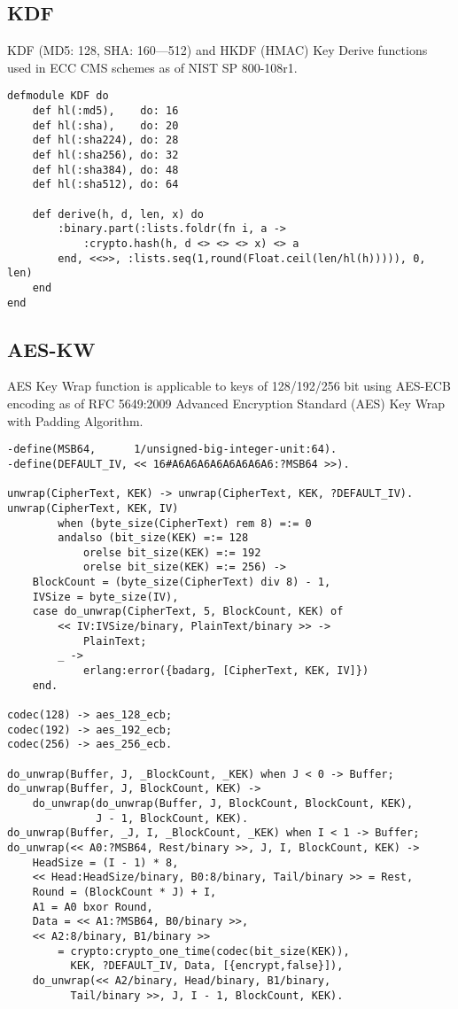 \subsection{KDF}

KDF (MD5: 128, SHA: 160—512) and HKDF (HMAC) Key Derive functions used in ECC CMS schemes as of NIST SP 800-108r1.

\begin{lstlisting}
defmodule KDF do
    def hl(:md5),    do: 16
    def hl(:sha),    do: 20
    def hl(:sha224), do: 28
    def hl(:sha256), do: 32
    def hl(:sha384), do: 48
    def hl(:sha512), do: 64

    def derive(h, d, len, x) do
        :binary.part(:lists.foldr(fn i, a ->
            :crypto.hash(h, d <> <> <> x) <> a
        end, <<>>, :lists.seq(1,round(Float.ceil(len/hl(h))))), 0, len)
    end
end
\end{lstlisting}

\newpage
\subsection{AES-KW}

AES Key Wrap function is applicable to keys of 128/192/256 bit using AES-ECB encoding as of RFC 5649:2009 Advanced Encryption Standard (AES) Key Wrap with Padding Algorithm.

\begin{lstlisting}
-define(MSB64,      1/unsigned-big-integer-unit:64).
-define(DEFAULT_IV, << 16#A6A6A6A6A6A6A6A6:?MSB64 >>).

unwrap(CipherText, KEK) -> unwrap(CipherText, KEK, ?DEFAULT_IV).
unwrap(CipherText, KEK, IV)
        when (byte_size(CipherText) rem 8) =:= 0
        andalso (bit_size(KEK) =:= 128
            orelse bit_size(KEK) =:= 192
            orelse bit_size(KEK) =:= 256) ->
    BlockCount = (byte_size(CipherText) div 8) - 1,
    IVSize = byte_size(IV),
    case do_unwrap(CipherText, 5, BlockCount, KEK) of
        << IV:IVSize/binary, PlainText/binary >> ->
            PlainText;
        _ ->
            erlang:error({badarg, [CipherText, KEK, IV]})
    end.

codec(128) -> aes_128_ecb;
codec(192) -> aes_192_ecb;
codec(256) -> aes_256_ecb.

do_unwrap(Buffer, J, _BlockCount, _KEK) when J < 0 -> Buffer;
do_unwrap(Buffer, J, BlockCount, KEK) ->
    do_unwrap(do_unwrap(Buffer, J, BlockCount, BlockCount, KEK),
              J - 1, BlockCount, KEK).
do_unwrap(Buffer, _J, I, _BlockCount, _KEK) when I < 1 -> Buffer;
do_unwrap(<< A0:?MSB64, Rest/binary >>, J, I, BlockCount, KEK) ->
    HeadSize = (I - 1) * 8,
    << Head:HeadSize/binary, B0:8/binary, Tail/binary >> = Rest,
    Round = (BlockCount * J) + I,
    A1 = A0 bxor Round,
    Data = << A1:?MSB64, B0/binary >>,
    << A2:8/binary, B1/binary >>
        = crypto:crypto_one_time(codec(bit_size(KEK)),
          KEK, ?DEFAULT_IV, Data, [{encrypt,false}]),
    do_unwrap(<< A2/binary, Head/binary, B1/binary,
          Tail/binary >>, J, I - 1, BlockCount, KEK).
\end{lstlisting}

